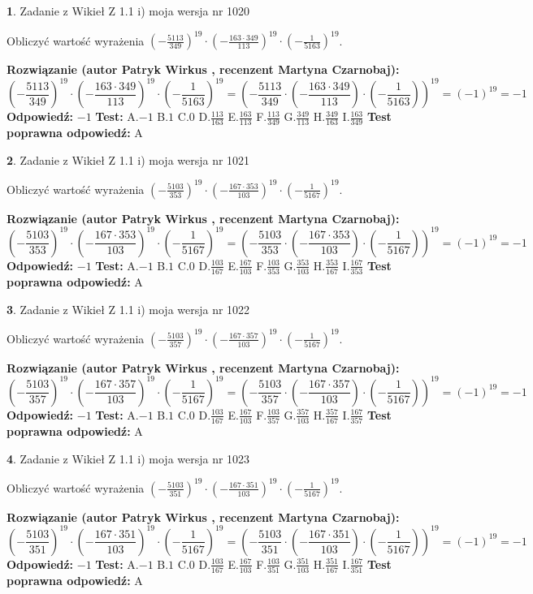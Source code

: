 \documentclass[12pt, a4paper]{article}
\theoremstyle{definition} %
\newtheorem{zad}{}
\newcommand{\zadStart}[1]{\begin{zad}#1\newline}
\newcommand{\zadStop}{\end{zad}}
\newcommand{\rozwStart}[2]{\noindent \textbf{Rozwiązanie (autor #1 , recenzent #2): }\newline}
\newcommand{\rozwStop}{\newline}
\newcommand{\odpStart}{\noindent \textbf{Odpowiedź:}\newline}
\newcommand{\odpStop}{\newline}
\newcommand{\testStart}{\noindent \textbf{Test:}\newline}
\newcommand{\testStop}{\newline}
\newcommand{\kluczStart}{\noindent \textbf{Test poprawna odpowiedź:}\newline}
\newcommand{\kluczStop}{\newline}
\begin{document}
\zadStart{Zadanie z Wikieł Z 1.1 i) moja wersja nr 1020}

Obliczyć wartość wyrażenia $(-\frac{5113}{349})^{19} \cdot (-\frac{163 \cdot 349}{113})^{19} \cdot (-\frac{1}{5163})^{19}$.
\zadStop
\rozwStart{Patryk Wirkus}{Martyna Czarnobaj}
$$(-\frac{5113}{349})^{19} \cdot (-\frac{163 \cdot 349}{113})^{19} \cdot (-\frac{1}{5163})^{19} = (-\frac{5113}{349} \cdot (-\frac{163 \cdot 349}{113}) \cdot (-\frac{1}{5163}))^{19} = (-1)^{19} = -1$$
\rozwStop
\odpStart
$-1$
\odpStop
\testStart
A.$-1$ B.$1$ C.$0$ D.$\frac{113}{163}$ E.$\frac{163}{113}$
F.$\frac{113}{349}$ G.$\frac{349}{113}$
H.$\frac{349}{163}$
I.$\frac{163}{349}$
\testStop
\kluczStart
A
\kluczStop



\zadStart{Zadanie z Wikieł Z 1.1 i) moja wersja nr 1021}

Obliczyć wartość wyrażenia $(-\frac{5103}{353})^{19} \cdot (-\frac{167 \cdot 353}{103})^{19} \cdot (-\frac{1}{5167})^{19}$.
\zadStop
\rozwStart{Patryk Wirkus}{Martyna Czarnobaj}
$$(-\frac{5103}{353})^{19} \cdot (-\frac{167 \cdot 353}{103})^{19} \cdot (-\frac{1}{5167})^{19} = (-\frac{5103}{353} \cdot (-\frac{167 \cdot 353}{103}) \cdot (-\frac{1}{5167}))^{19} = (-1)^{19} = -1$$
\rozwStop
\odpStart
$-1$
\odpStop
\testStart
A.$-1$ B.$1$ C.$0$ D.$\frac{103}{167}$ E.$\frac{167}{103}$
F.$\frac{103}{353}$ G.$\frac{353}{103}$
H.$\frac{353}{167}$
I.$\frac{167}{353}$
\testStop
\kluczStart
A
\kluczStop



\zadStart{Zadanie z Wikieł Z 1.1 i) moja wersja nr 1022}

Obliczyć wartość wyrażenia $(-\frac{5103}{357})^{19} \cdot (-\frac{167 \cdot 357}{103})^{19} \cdot (-\frac{1}{5167})^{19}$.
\zadStop
\rozwStart{Patryk Wirkus}{Martyna Czarnobaj}
$$(-\frac{5103}{357})^{19} \cdot (-\frac{167 \cdot 357}{103})^{19} \cdot (-\frac{1}{5167})^{19} = (-\frac{5103}{357} \cdot (-\frac{167 \cdot 357}{103}) \cdot (-\frac{1}{5167}))^{19} = (-1)^{19} = -1$$
\rozwStop
\odpStart
$-1$
\odpStop
\testStart
A.$-1$ B.$1$ C.$0$ D.$\frac{103}{167}$ E.$\frac{167}{103}$
F.$\frac{103}{357}$ G.$\frac{357}{103}$
H.$\frac{357}{167}$
I.$\frac{167}{357}$
\testStop
\kluczStart
A
\kluczStop



\zadStart{Zadanie z Wikieł Z 1.1 i) moja wersja nr 1023}

Obliczyć wartość wyrażenia $(-\frac{5103}{351})^{19} \cdot (-\frac{167 \cdot 351}{103})^{19} \cdot (-\frac{1}{5167})^{19}$.
\zadStop
\rozwStart{Patryk Wirkus}{Martyna Czarnobaj}
$$(-\frac{5103}{351})^{19} \cdot (-\frac{167 \cdot 351}{103})^{19} \cdot (-\frac{1}{5167})^{19} = (-\frac{5103}{351} \cdot (-\frac{167 \cdot 351}{103}) \cdot (-\frac{1}{5167}))^{19} = (-1)^{19} = -1$$
\rozwStop
\odpStart
$-1$
\odpStop
\testStart
A.$-1$ B.$1$ C.$0$ D.$\frac{103}{167}$ E.$\frac{167}{103}$
F.$\frac{103}{351}$ G.$\frac{351}{103}$
H.$\frac{351}{167}$
I.$\frac{167}{351}$
\testStop
\kluczStart
A
\kluczStop
\end{document}
